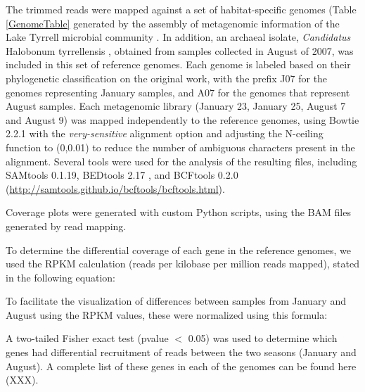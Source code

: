 The trimmed reads were mapped against a set of habitat-specific genomes (Table \ref{GenomeTable} generated by the assembly of metagenomic information of the Lake Tyrrell microbial community \cite{Narasingarao:2012kp,Podell:2013kx,Podell:2013fp}. In addition, an archaeal isolate, \textit{Candidatus} Halobonum tyrrellensis \cite{Ugalde:2013hb}, obtained from samples collected in August of 2007, was included in this set of reference genomes. Each genome is labeled based on their phylogenetic classification on the original work, with the prefix J07 for the genomes representing January samples, and A07 for the genomes that represent August samples. Each metagenomic library (January 23, January 25, August 7 and August 9) was mapped independently to the reference genomes, using Bowtie 2.2.1 \cite{Langmead:2012jh} with the \textit{very-sensitive} alignment option and adjusting the N-ceiling function to (0,0.01) to reduce the number of ambiguous characters present in the alignment. Several tools were used for the analysis of the resulting files, including SAMtools 0.1.19\cite{Li:2009ka}, BEDtools 2.17 \cite{Quinlan:2010km}, and BCFtools 0.2.0 (\url{http://samtools.github.io/bcftools/bcftools.html}).

Coverage plots were generated with custom Python scripts, using the BAM files generated by read mapping.

To determine the differential coverage of each gene in the reference genomes, we used the RPKM calculation (reads per kilobase per million reads mapped), stated in the following equation:

\begin{center}
\end{center}

To facilitate the visualization of differences between samples from January and August using the RPKM values, these were normalized using this formula:

\begin{center}
\end{center}

A two-tailed Fisher exact test (pvalue $<$ 0.05) was used to determine which genes had differential recruitment of reads between the two seasons (January and August). A complete list of these genes in each of the genomes can be found here (XXX).

